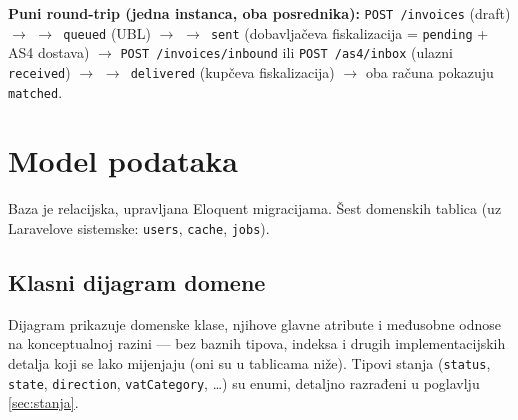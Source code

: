 \documentclass[11pt,a4paper]{article}
\begin{document}
\textbf{Puni round-trip (jedna instanca, oba posrednika):} \texttt{POST /invoices} (draft) $\rightarrow$
\texttt{$\rightarrow$ queued} (UBL) $\rightarrow$ \texttt{$\rightarrow$ sent} (dobavljačeva fiskalizacija = \texttt{pending} + AS4 dostava) $\rightarrow$
\texttt{POST /invoices/inbound} ili \texttt{POST /as4/inbox} (ulazni \texttt{received}) $\rightarrow$ \texttt{$\rightarrow$ delivered}
(kupčeva fiskalizacija) $\rightarrow$ oba računa pokazuju \texttt{matched}.

\section{Model podataka}

Baza je relacijska, upravljana Eloquent migracijama. Šest domenskih tablica (uz Laravelove
sistemske: \texttt{users}, \texttt{cache}, \texttt{jobs}).

\subsection{Klasni dijagram domene}

Dijagram prikazuje domenske klase, njihove glavne atribute i međusobne odnose na
konceptualnoj razini — bez baznih tipova, indeksa i drugih implementacijskih
detalja koji se lako mijenjaju (oni su u tablicama niže). Tipovi stanja
(\texttt{status}, \texttt{state}, \texttt{direction}, \texttt{vatCategory}, …) su enumi,
detaljno razrađeni u poglavlju \ref{sec:stanja}.
\end{document}
